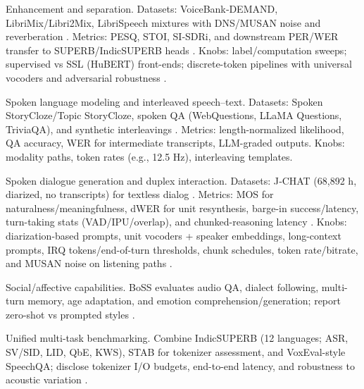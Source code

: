 Enhancement and separation. Datasets: VoiceBank‑DEMAND, LibriMix/Libri2Mix, LibriSpeech mixtures with DNS/MUSAN noise and reverberation \cite{bai2025dmelspeechtokenizationmadesimple,messica2024nastnoiseawarespeechtokenizationlanguage}. Metrics: PESQ, STOI, SI‑SDRi, and downstream PER/WER transfer to SUPERB/IndicSUPERB heads \cite{entry2025indicsuperbspeechprocessinguniversalperf}. Knobs: label/computation sweeps; supervised vs SSL (HuBERT) front-ends; discrete-token pipelines with universal vocoders and adversarial robustness \cite{chen2023reducingbarriersselfsupervisedlearninghu,mousavi2024howshouldweextractdiscreteaudiotokenssel,djanibekov2025spiritpatchingspeechlanguagemodelsagains}.

Spoken language modeling and interleaved speech–text. Datasets: Spoken StoryCloze/Topic StoryCloze, spoken QA (WebQuestions, LLaMA Questions, TriviaQA), and synthetic interleavings \cite{zeng2024scalingspeechtextpretrainingsyntheticint}. Metrics: length-normalized likelihood, QA accuracy, WER for intermediate transcripts, LLM-graded outputs. Knobs: modality paths, token rates (e.g., 12.5 Hz), interleaving templates.

Spoken dialogue generation and duplex interaction. Datasets: J‑CHAT (68,892 h, diarized, no transcripts) for textless dialog \cite{nakata2024jchatjapaneselargescalespokendialoguecor}. Metrics: MOS for naturalness/meaningfulness, dWER for unit resynthesis, barge-in success/latency, turn-taking stats (VAD/IPU/overlap), and chunked-reasoning latency \cite{chiang2025stitchsimultaneousthinkingtalkingchunked}. Knobs: diarization-based prompts, unit vocoders + speaker embeddings, long-context prompts, IRQ tokens/end-of-turn thresholds, chunk schedules, token rate/bitrate, and MUSAN noise on listening paths \cite{li2025continuousspeechtokenizertext,vashishth2024stabspeechtokenizerassessmentbenchmark}.

Social/affective capabilities. BoSS evaluates audio QA, dialect following, multi-turn memory, age adaptation, and emotion comprehension/generation; report zero-shot vs prompted styles \cite{wang2025bossbeyondsemanticspeech}.

Unified multi-task benchmarking. Combine IndicSUPERB (12 languages; ASR, SV/SID, LID, QbE, KWS), STAB for tokenizer assessment, and VoxEval-style SpeechQA; disclose tokenizer I/O budgets, end-to-end latency, and robustness to acoustic variation \cite{vashishth2024stabspeechtokenizerassessmentbenchmark,cui2025voxevalbenchmarkingknowledgeunderstandin,maimon2025salmonsuiteacousticlanguagemodelevaluati}.




